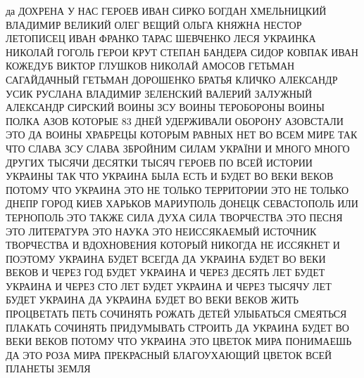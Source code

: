  
 
 
 
 

да ДОХРЕНА У НАС ГЕРОЕВ ИВАН СИРКО БОГДАН ХМЕЛЬНИЦКИЙ ВЛАДИМИР ВЕЛИКИЙ ОЛЕГ
ВЕЩИЙ ОЛЬГА КНЯЖНА НЕСТОР ЛЕТОПИСЕЦ ИВАН ФРАНКО ТАРАС ШЕВЧЕНКО ЛЕСЯ УКРАИНКА
НИКОЛАЙ ГОГОЛЬ ГЕРОИ КРУТ СТЕПАН БАНДЕРА СИДОР КОВПАК ИВАН КОЖЕДУБ ВИКТОР
ГЛУШКОВ НИКОЛАЙ АМОСОВ ГЕТЬМАН САГАЙДАЧНЫЙ ГЕТЬМАН ДОРОШЕНКО БРАТЬЯ КЛИЧКО
АЛЕКСАНДР УСИК РУСЛАНА ВЛАДИМИР ЗЕЛЕНСКИЙ ВАЛЕРИЙ ЗАЛУЖНЫЙ АЛЕКСАНДР СИРСКИЙ
ВОИНЫ ЗСУ ВОИНЫ ТЕРОБОРОНЫ ВОИНЫ ПОЛКА АЗОВ КОТОРЫЕ 83 ДНЕЙ УДЕРЖИВАЛИ ОБОРОНУ
АЗОВСТАЛИ ЭТО ДА ВОИНЫ ХРАБРЕЦЫ КОТОРЫМ РАВНЫХ НЕТ ВО ВСЕМ МИРЕ ТАК ЧТО СЛАВА
ЗСУ СЛАВА ЗБРОЙНИМ СИЛАМ УКРАЇНИ И МНОГО МНОГО ДРУГИХ ТЫСЯЧИ ДЕСЯТКИ ТЫСЯЧ
ГЕРОЕВ ПО ВСЕЙ ИСТОРИИ УКРАИНЫ ТАК ЧТО  УКРАИНА БЫЛА ЕСТЬ И БУДЕТ ВО ВЕКИ ВЕКОВ
ПОТОМУ ЧТО УКРАИНА ЭТО НЕ ТОЛЬКО ТЕРРИТОРИИ ЭТО НЕ ТОЛЬКО ДНЕПР ГОРОД КИЕВ
ХАРЬКОВ МАРИУПОЛЬ ДОНЕЦК СЕВАСТОПОЛЬ ИЛИ ТЕРНОПОЛЬ ЭТО ТАКЖЕ СИЛА ДУХА СИЛА
ТВОРЧЕСТВА ЭТО ПЕСНЯ ЭТО ЛИТЕРАТУРА ЭТО НАУКА ЭТО НЕИССЯКАЕМЫЙ ИСТОЧНИК
ТВОРЧЕСТВА И ВДОХНОВЕНИЯ КОТОРЫЙ НИКОГДА НЕ ИССЯКНЕТ И ПОЭТОМУ УКРАИНА БУДЕТ
ВСЕГДА ДА УКРАИНА БУДЕТ ВО ВЕКИ ВЕКОВ И ЧЕРЕЗ ГОД БУДЕТ УКРАИНА И ЧЕРЕЗ ДЕСЯТЬ
ЛЕТ БУДЕТ УКРАИНА И ЧЕРЕЗ СТО ЛЕТ БУДЕТ УКРАИНА И ЧЕРЕЗ ТЫСЯЧУ ЛЕТ БУДЕТ
УКРАИНА ДА УКРАИНА БУДЕТ ВО ВЕКИ ВЕКОВ ЖИТЬ ПРОЦВЕТАТЬ ПЕТЬ СОЧИНЯТЬ РОЖАТЬ
ДЕТЕЙ УЛЫБАТЬСЯ СМЕЯТЬСЯ ПЛАКАТЬ СОЧИНЯТЬ ПРИДУМЫВАТЬ СТРОИТЬ ДА УКРАИНА БУДЕТ
ВО ВЕКИ ВЕКОВ ПОТОМУ ЧТО УКРАИНА ЭТО ЦВЕТОК МИРА ПОНИМАЕШЬ ДА ЭТО РОЗА МИРА
ПРЕКРАСНЫЙ БЛАГОУХАЮЩИЙ ЦВЕТОК ВСЕЙ ПЛАНЕТЫ ЗЕМЛЯ
